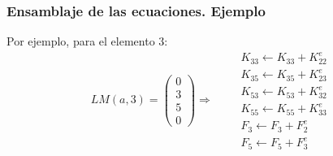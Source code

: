 \documentclass{beamer}
\begin{document}
\newpage
\begin{frame}
\frametitle{Ensamblaje de las ecuaciones. Ejemplo}
Por ejemplo, para el elemento $3$:
$$
LM(a,3)=\left(
\begin{array}{c}
0 \\
3 \\
5 \\
0
\end{array}
\right) \Rightarrow \qquad
\begin{array}{c}
K_{33} \leftarrow K_{33}+K^e_{22} \\
K_{35} \leftarrow K_{35}+K^e_{23} \\
K_{53} \leftarrow K_{53}+K^e_{32} \\
K_{55} \leftarrow K_{55}+K^e_{33} \\
F_3 \leftarrow F_3 + F^e_2 \\
F_5 \leftarrow F_5 + F^e_3
\end{array}
$$
\end{frame}
\end{document}
